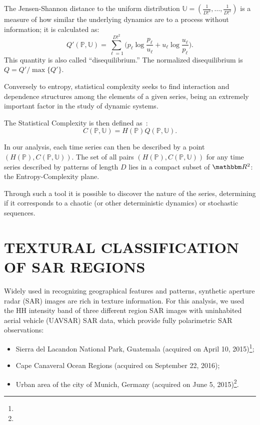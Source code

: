 \documentclass{isprs}
\begin{document}
The Jensen-Shannon distance to the uniform distribution $\mathbb{U} = (\frac{1}{D!^2}, \dots, \frac{1}{D!^2})$ is a measure of how similar the underlying dynamics are to a process without information; it is calculated as:
\begin{equation}
Q'(\mathbb{P}, \mathbb{U}) = \sum_{\ell=1}^{D!^2} \Big(p_\ell \log\frac{p_\ell}{u_\ell} +
u_\ell \log\frac{u_\ell}{p_\ell}
\Big).
\end{equation}
This quantity is also called ``disequilibrium.''
The normalized disequilibrium is $ Q=Q'/\max\{Q'\}$.

Conversely to entropy, statistical complexity seeks to find interaction and dependence structures among the elements of a given series, being an extremely important factor in the study of dynamic systems.

The Statistical Complexity is then defined as~\cite{Lamberti2004}:
\begin{equation}
C(\mathbb{P}, \mathbb{U}) = H(\mathbb{P}) Q(\mathbb{P}, \mathbb{U}).
\end{equation}

In our analysis, each time series can then be described by a point $(H(\mathbb{P}), C(\mathbb{P}, \mathbb{U}))$.
The set of all pairs $(H(\mathbb{P}), C(\mathbb{P}, \mathbb{U}))$ for any time series described by patterns of length $D$ lies in a compact subset of $\mathbbm R^2$: the Entropy-Complexity plane. 

Through such a tool it is possible to discover the nature of the series, determining if it corresponds to a chaotic (or other deterministic dynamics) or stochastic sequences.

\section{TEXTURAL CLASSIFICATION OF SAR REGIONS}\label{SAR}

Widely used in recognizing geographical features and patterns, synthetic aperture radar (SAR) images are rich in texture information.
For this analysis, we used the HH intensity band of three different region SAR images with uninhabited aerial vehicle (UAVSAR) SAR data, which provide fully polarimetric SAR observations:
\begin{itemize}
	\item Sierra del Lacandon National Park, Guatemala (acquired on April 10, 2015)\footnote{};
	\item Cape Canaveral Ocean Regions (acquired on September 22, 2016);
	\item Urban area of the city of Munich, Germany (acquired on June 5, 2015)\footnote{}.
\end{itemize}
\end{document}
